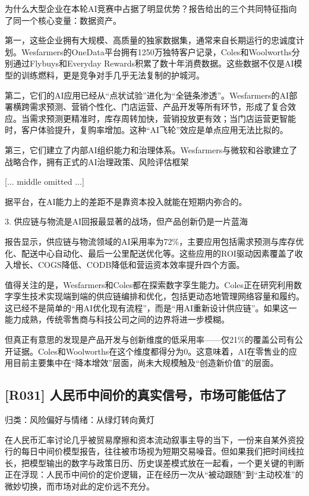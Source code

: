 \documentclass[11pt]{ctexart}
\begin{document}
为什么大型企业在本轮AI竞赛中占据了明显优势？报告给出的三个共同特征指向了同一个核心变量：数据资产。

第一，这些企业拥有大规模、高质量的独家数据集，通常来自长期运行的忠诚度计划。Wesfarmers的OneData平台拥有1250万独特客户记录，Coles和Woolworths分别通过Flybuys和Everyday Rewards积累了数十年消费数据。这些数据不仅是AI模型的训练燃料，更是竞争对手几乎无法复制的护城河。

第二，它们的AI应用已经从“点状试验”进化为“全链条渗透”。Wesfarmers的AI部署横跨需求预测、营销个性化、门店运营、产品开发等所有环节，形成了复合效应。当需求预测更精准时，库存周转加快，营销投放更有效；当门店运营更智能时，客户体验提升，复购率增加。这种“AI飞轮”效应是单点应用无法比拟的。

第三，它们建立了内部AI组织能力和治理体系。Wesfarmers与微软和谷歌建立了战略合作，拥有正式的AI治理政策、风险评估框架

[... middle omitted ...]

据平台，在AI能力上的差距不是靠资本投入就能在短期内弥合的。

3. 供应链与物流是AI回报最显著的战场，但产品创新仍是一片蓝海

报告显示，供应链与物流领域的AI采用率为72\%，主要应用包括需求预测与库存优化、配送中心自动化、最后一公里配送优化等。这些应用的ROI驱动因素覆盖了收入增长、COGS降低、CODB降低和营运资本效率提升四个方面。

值得关注的是，Wesfarmers和Coles都在探索数字孪生能力。Coles正在研究利用数字孪生技术实现端到端的供应链编排和优化，包括更动态地管理网络容量和履约。这已经不是简单的“用AI优化现有流程”，而是“用AI重新设计供应链”。如果这一能力成熟，传统零售商与科技公司之间的边界将进一步模糊。

但真正有意思的发现是产品开发与创新维度的低采用率——仅21\%的覆盖公司有公开证据。Coles和Woolworths在这个维度都得分为0。这意味着，AI在零售业的应用目前主要集中在“降本增效”层面，尚未大规模触及“创造新价值”的层面。

\subsection{[R031] 人民币中间价的真实信号，市场可能低估了}
{\small\color{refgray}归类：风险偏好与情绪：从绿灯转向黄灯}

在人民币汇率讨论几乎被贸易摩擦和资本流动叙事主导的当下，一份来自某外资投行的每日中间价模型报告，往往被市场视为短期交易噪音。但如果我们把时间线拉长，把模型输出的数字与政策日历、历史误差模式放在一起看，一个更关键的判断正在浮现：人民币中间价的定价逻辑，正在经历一次从“被动跟随”到“主动校准”的微妙切换，而市场对此的定价远不充分。
\end{document}

